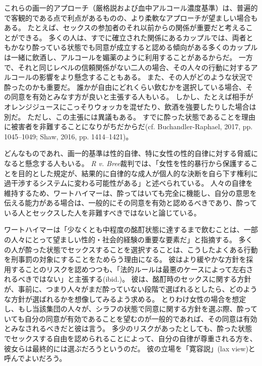 \documentclass[paper=a4,book,openany]{jlreq} \usepackage{mystyle}
\begin{document}
これらの画一的アプローチ（厳格説および血中アルコール濃度基準）は、普遍的で客観的である点で利点があるものの、より柔軟なアプローチが望ましい場合もある。
たとえば、セックスの参加者のそれ以前からの関係が重要だと考えることができる。
多くの人は、すでに確立された関係にあるカップルでは、両者ともかなり酔っている状態でも同意が成立すると認める傾向がある{\DDASH}多くのカップルは一緒に飲酒し、アルコールを媚薬のように利用することがあるからだ。
一方で、それと同じレベルの信頼関係がない二人の場合、その人々の行動に対するアルコールの影響をより懸念することもある。
また、その人がどのような状況で酔ったのかも重要だ。
誰かが自由にどれくらい飲むかを選択している場合、その同意を有効とみなす方が良いと主張する人もいる。
しかし、たとえば相手がオレンジジュースにこっそりウォッカを混ぜたり、飲酒を強要したりした場合は別だ。
ただし、この主張には異議もある。
すでに酔った状態であることを理由に被害者を非難することになりがちだからだ(cf. Buchandler-Raphael, 2017, pp. 1045--1049; Shaw, 2016, pp. 1414--1421)\nocite{buchhandler-raphael17:_conun_volun_intox_sex}\nocite{shaw16:_title_ix_sexual_assaul_issue_effec_consen}。

どんなものであれ、画一的基準は性的自律、特に女性の性的自律に対する脅威になると懸念する人もいる。
\emph{R v. Bree}裁判では、「女性を性的暴行から保護することを目的とした規定が、結果的に自律的な成人が個人的な決断を自ら下す権利に過干渉するシステムに変わる可能性がある」と述べられている。
人々の自律を維持するため、ワートハイマーは、酔ってはいても完全に機能し、自分の意思を伝える能力がある場合は、一般的にその同意を有効と認めるべきであり、酔っている人とセックスした人を非難すべきではないと論じている。

ワートハイマーは「少なくとも中程度の酩酊状態に達するまで飲むことは、一部の人々にとって望ましい性的・社会的経験の重要な要素だ」と指摘する\citep[p. 251]{wertheimer03:_consen_sexual_relat}。
多くの人が酔った状態でセックスすることを選択することは、こうしたよくある行動を刑事罰の対象にすることをためらう理由になる。
彼はより緩やかな方針を採用することのリスクを認めつつも、「法的ルールは最悪のケースによって左右されるべきではない」と主張する(ibid.)。
彼は、酩酊時のセックスに関する方針が、事前に、つまり人々がまだ酔っていない段階で選ばれるとしたら、どのような方針が選ばれるかを想像してみるよう求める。
とりわけ女性の場合を想定し、もし当該集団の人々が、シラフの状態で同意に関する方針を選ぶ際、酔っていても自分の同意が有効であることを望むのが一般的であれば、その同意は有効とみなされるべきだと彼は言う。
多少のリスクがあったとしても、酔った状態でセックスする自由を認められることによって、自分の自律が尊重される方を、彼女らは最終的には選ぶだろうというのだ。
彼の立場を「寛容説」(lax view)と呼んでよいだろう。
\end{document}
